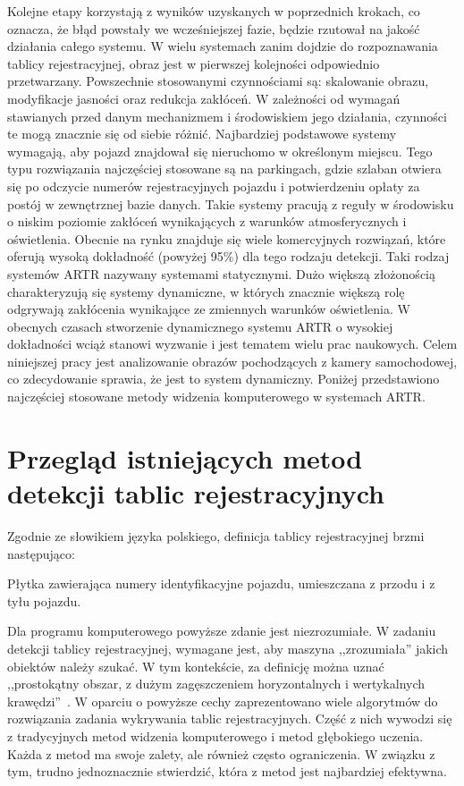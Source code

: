 \FloatBarrier
Kolejne etapy korzystają z wyników uzyskanych w poprzednich krokach, co oznacza, że błąd powstały we wcześniejszej fazie, będzie rzutował na jakość działania całego systemu.
W wielu systemach zanim dojdzie do rozpoznawania tablicy rejestracyjnej, obraz jest w pierwszej kolejności odpowiednio przetwarzany.
Powszechnie stosowanymi czynnościami są: skalowanie obrazu, modyfikacje jasności oraz redukcja zakłóceń.
\linebreak W zależności od wymagań stawianych przed danym mechanizmem i środowiskiem jego działania, czynności te mogą znacznie się od siebie różnić.
Najbardziej podstawowe systemy wymagają, aby pojazd znajdował się nieruchomo w określonym miejscu.
Tego typu rozwiązania najczęściej stosowane są na parkingach, gdzie szlaban otwiera się po odczycie numerów rejestracyjnych pojazdu i potwierdzeniu opłaty za postój w zewnętrznej bazie danych.
Takie systemy pracują z reguły w środowisku o niskim poziomie zakłóceń wynikających z warunków atmosferycznych i oświetlenia.
Obecnie na rynku znajduje się wiele komercyjnych rozwiązań, które oferują wysoką dokładność (powyżej 95\%) dla tego rodzaju detekcji.
Taki rodzaj systemów ARTR nazywany systemami statycznymi.
Dużo większą złożonością charakteryzują się systemy dynamiczne, w których znacznie większą rolę odgrywają zakłócenia wynikające ze zmiennych warunków oświetlenia.
W obecnych czasach stworzenie dynamicznego systemu ARTR o wysokiej dokładności wciąż stanowi wyzwanie i jest tematem wielu prac naukowych.
Celem niniejszej pracy jest analizowanie obrazów pochodzących z kamery samochodowej, co zdecydowanie sprawia, że jest to system dynamiczny.
Poniżej przedstawiono najczęściej stosowane metody widzenia komputerowego w systemach ARTR\@.


\section{Przegląd istniejących metod detekcji tablic rejestracyjnych}

Zgodnie ze słowikiem języka polskiego, definicja tablicy rejestracyjnej brzmi następująco:
\begin{definition}
    Płytka zawierająca numery identyfikacyjne pojazdu, umieszczana z przodu i z tyłu pojazdu.
\end{definition}
Dla programu komputerowego powyższe zdanie jest niezrozumiałe.
W zadaniu detekcji tablicy rejestracyjnej, wymagane jest, aby maszyna ,,zrozumiała'' jakich obiektów należy szukać.
W tym kontekście, za definicję można uznać ,,prostokątny obszar, z dużym zagęszczeniem horyzontalnych i wertykalnych krawędzi''~\cite{824138}.
W oparciu o powyższe cechy zaprezentowano wiele algorytmów do rozwiązania zadania wykrywania tablic rejestracyjnych.
Część z nich wywodzi się z tradycyjnych metod widzenia komputerowego i metod głębokiego uczenia.
Każda z metod ma swoje zalety, ale również często ograniczenia.
W związku z tym, trudno jednoznacznie stwierdzić, która z metod jest najbardziej efektywna.

